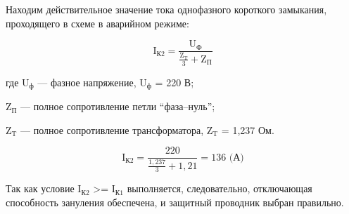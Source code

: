Находим действительное значение тока однофазного короткого замыкания, проходящего в схеме в аварийном режиме:

\begin{displaymath}
  \text{I}_\text{К2} = \frac{\text{U}_\text{Ф}}{\frac{\text{Z}_\text{T}}{3}+\text{Z}_\text{П}}
\end{displaymath}

где \(\text{U}_\text{ф}\) --- фазное напряжение, \(\text{U}_\text{ф}\) = 220 В;

\(\text{Z}_\text{П}\) --- полное сопротивление петли “фаза–нуль”;

\(\text{Z}_\text{T}\) --- полное сопротивление трансформатора, \(\text{Z}_\text{T}\) = 1,237 Ом.

\begin{displaymath}
  \text{I}_\text{К2} = \frac{220}{\frac{1,237}{3}+1,21} = 136 \text{ (А)}
\end{displaymath}

Так как условие \(\text{I}_\text{К2}\) >= \(\text{I}_\text{К1}\) выполняется, следовательно, отключающая способность зануления обеспечена, и защитный проводник выбран правильно.


